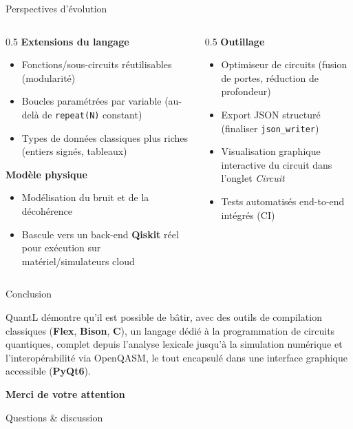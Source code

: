 \documentclass[10pt]{beamer}
\begin{document}
\begin{frame}{Perspectives d'évolution}
  \begin{columns}[T]
    \begin{column}{0.5\textwidth}
      \textbf{Extensions du langage}
      \begin{itemize}
        \small
        \item Fonctions/sous-circuits réutilisables (modularité)
        \item Boucles paramétrées par variable (au-delà de \texttt{repeat(N)} constant)
        \item Types de données classiques plus riches (entiers signés, tableaux)
      \end{itemize}
      \textbf{Modèle physique}
      \begin{itemize}
        \small
        \item Modélisation du bruit et de la décohérence
        \item Bascule vers un back-end \textbf{Qiskit} réel pour exécution sur matériel/simulateurs cloud
      \end{itemize}
    \end{column}
    \begin{column}{0.5\textwidth}
      \textbf{Outillage}
      \begin{itemize}
        \small
        \item Optimiseur de circuits (fusion de portes, réduction de profondeur)
        \item Export JSON structuré (finaliser \texttt{json\_writer})
        \item Visualisation graphique interactive du circuit dans l'onglet \emph{Circuit}
        \item Tests automatisés end-to-end intégrés (CI)
      \end{itemize}
    \end{column}
  \end{columns}
\end{frame}

\begin{frame}{Conclusion}
  \begin{keybox}[title=Synthèse]
    QuantL démontre qu'il est possible de bâtir, avec des outils de compilation classiques (\textbf{Flex}, \textbf{Bison}, \textbf{C}), un langage dédié à la programmation de circuits quantiques, complet depuis l'analyse lexicale jusqu'à la simulation numérique et l'interopérabilité via OpenQASM, le tout encapsulé dans une interface graphique accessible (\textbf{PyQt6}).
  \end{keybox}
  \vspace{10pt}
  \centering
  \Large \textcolor{quantlblue}{\textbf{Merci de votre attention}}

  \vspace{6pt}
  \normalsize Questions \& discussion
\end{frame}
\end{document}
